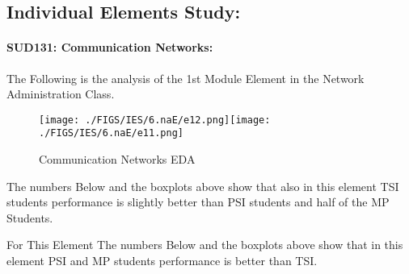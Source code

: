 \documentclass[12pt]{extreport}
\begin{document}
\subsection{Individual Elements Study:}



\paragraph{\large SUD131: Communication Networks:\\
} 
The Following is the analysis of the 1st Module Element in the Network Administration Class.

\begin{figure}[H]
	\centering
	\texttt{[image: ./FIGS/IES/6.naE/e12.png]}\texttt{[image: ./FIGS/IES/6.naE/e11.png]}
	\caption{Communication Networks EDA}
	\label{fig:72}
\end{figure}

The numbers Below and the boxplots above show that also in this element  TSI students performance is slightly better than PSI students and half of the MP Students.

For This Element The numbers Below and the boxplots above show that in this element  PSI and MP students performance is  better than TSI.
\end{document}
